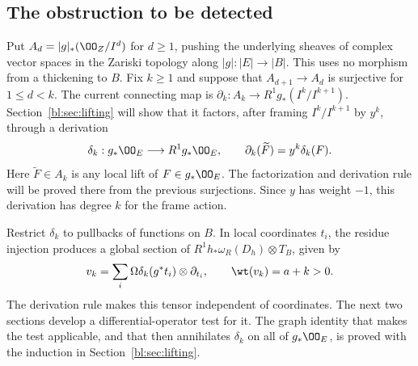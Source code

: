 \subsection{The obstruction to be detected}
\label{bl:cov:obstruction-contract}

Put $A_d=|g|_*(\OO_Z/I^d)$ for $d\geq1$, pushing the underlying
sheaves of complex vector spaces in the Zariski topology along
$|g|:|E|\to|B|$. This uses no morphism from a thickening to $B$.
Fix $k\geq1$ and suppose that $A_{d+1}\to A_d$ is surjective
for $1\leq d<k$.
The current connecting map is
$\partial_k:A_k\to R^1g_*(I^k/I^{k+1})$.
Section~\ref{bl:sec:lifting} will show that it factors, after framing
$I^k/I^{k+1}$ by $y^k$, through a derivation
\[
 \delta_k:g_*\OO_E\longrightarrow R^1g_*\OO_E,
 \qquad \partial_k(\widetilde F)=y^k\delta_k(F).
\]
Here $\widetilde F\in A_k$ is any local lift of $F\in g_*\OO_E$.
The factorization and derivation rule will be proved there from the
previous surjections. Since $y$ has weight $-1$, this derivation
has degree $k$ for the frame action.

Restrict $\delta_k$ to pullbacks of functions on $B$. In local
coordinates $t_i$, the residue injection produces a global section
of $R^1h_*\omega_R(D_h)\otimes T_B$, given by
\[
 v_k=\sum_i\Omega\delta_k(g^*t_i)\otimes\partial_{t_i}
 ,\qquad \wt(v_k)=a+k>0.
\]
The derivation rule makes this tensor independent of coordinates.
The next two sections develop a differential-operator test for it.
The graph identity that makes the test applicable, and that then
annihilates $\delta_k$ on all of $g_*\OO_E$, is proved with the
induction in Section~\ref{bl:sec:lifting}.
